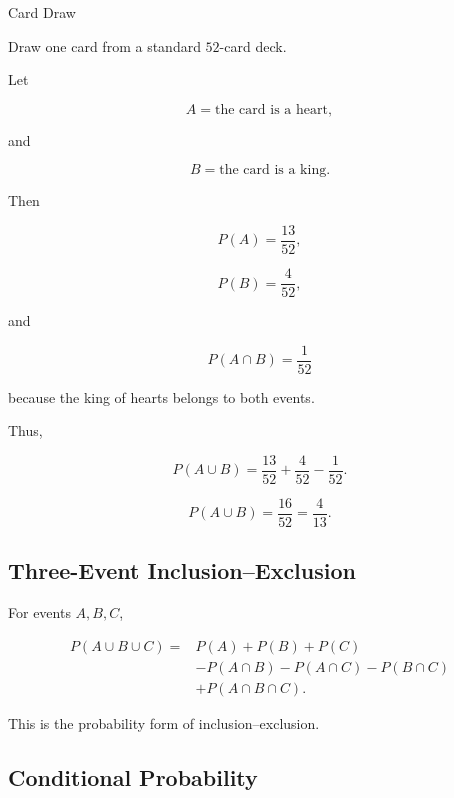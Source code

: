 \begin{workedexamplebox}{Card Draw}

Draw one card from a standard \(52\)-card deck.

Let

\[
A
=
\text{the card is a heart},
\]

and

\[
B
=
\text{the card is a king}.
\]

Then

\[
P(A)=\frac{13}{52},
\]

\[
P(B)=\frac4{52},
\]

and

\[
P(A\cap B)=\frac1{52}
\]

because the king of hearts belongs to both events.

Thus,

\[
P(A\cup B)
=
\frac{13}{52}
+
\frac4{52}
-
\frac1{52}.
\]

\begin{answerbox}
\[
\boxed{
P(A\cup B)
=
\frac{16}{52}
=
\frac4{13}.
}
\]
\end{answerbox}

\end{workedexamplebox}

\subsection{Three-Event Inclusion--Exclusion}
\label{subsec:three-event-inclusion-exclusion}

For events \(A,B,C\),

\[
\boxed{
\begin{aligned}
P(A\cup B\cup C)
={}&
P(A)+P(B)+P(C)
\\
&-
P(A\cap B)
-
P(A\cap C)
-
P(B\cap C)
\\
&+
P(A\cap B\cap C).
\end{aligned}
}
\]

This is the probability form of inclusion--exclusion.

\subsection{Conditional Probability}
\label{subsec:conditional-probability}

